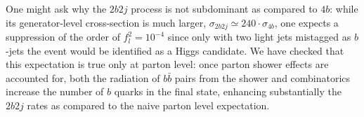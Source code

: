   One might ask why the $2b2j$ process
  is not subdominant as compared to $4b$: while its generator-level cross-section is
  much larger, $\sigma_{2b2j} \simeq 240\cdot \sigma_{4b}$, one expects a suppression
  of the order of $f_l^2 =10^{-4}$ since only with two light jets mistagged as $b$-jets the event
  would be identified as a Higgs candidate.
  We have checked that this expectation is true only at parton level: once parton shower effects
  are accounted for, both the radiation of $b\bar{b}$ pairs from the shower and combinatorics increase
  the number of $b$ quarks in the final state, enhancing substantially the $2b2j$ rates as compared
  to the naive parton level expectation.





